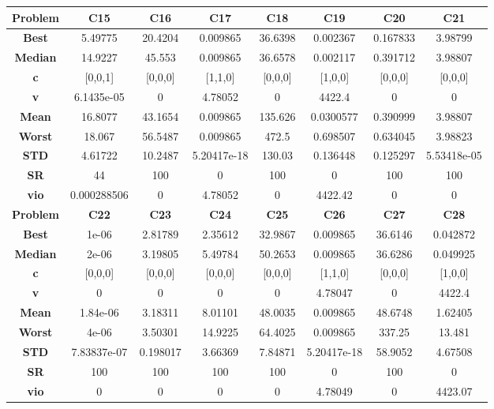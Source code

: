 \documentclass{IEEEtran}
\begin{document}
\begin{center}
\begin{tabular}{|c|c|c|c|c|c|c|c|}
    \hline 
    \hline 
    \textbf{Problem} & \textbf{C15} & \textbf{C16} & \textbf{C17} & \textbf{C18} & \textbf{C19} & \textbf{C20} & \textbf{C21} \\ 
    \hline\hline 
    \textbf{Best} & 5.49775 & 20.4204 & 0.009865 & 36.6398 & 0.002367 & 0.167833 & 3.98799\\ 
    \textbf{Median} & 14.9227 & 45.553 & 0.009865 & 36.6578 & 0.002117 & 0.391712 & 3.98807\\ 
    \textbf{c} & [0,0,1] & [0,0,0] & [1,1,0] & [0,0,0] & [1,0,0] & [0,0,0] & [0,0,0]\\ 
    \textbf{v} & 6.1435e-05 & 0 & 4.78052 & 0 & 4422.4 & 0 & 0\\ 
    \textbf{Mean} & 16.8077 & 43.1654 & 0.009865 & 135.626 & 0.0300577 & 0.390999 & 3.98807\\ 
    \textbf{Worst} & 18.067 & 56.5487 & 0.009865 & 472.5 & 0.698507 & 0.634045 & 3.98823\\ 
    \textbf{STD} & 4.61722 & 10.2487 & 5.20417e-18 & 130.03 & 0.136448 & 0.125297 & 5.53418e-05\\ 
    \textbf{SR} & 44 & 100 & 0 & 100 & 0 & 100 & 100\\ 
    \textbf{vio} & 0.000288506 & 0 & 4.78052 & 0 & 4422.42 & 0 & 0\\ 
    \hline 
    \hline 
    \textbf{Problem} & \textbf{C22} & \textbf{C23} & \textbf{C24} & \textbf{C25} & \textbf{C26} & \textbf{C27} & \textbf{C28} \\ 
    \hline\hline 
    \textbf{Best} & 1e-06 & 2.81789 & 2.35612 & 32.9867 & 0.009865 & 36.6146 & 0.042872\\ 
    \textbf{Median} & 2e-06 & 3.19805 & 5.49784 & 50.2653 & 0.009865 & 36.6286 & 0.049925\\ 
    \textbf{c} & [0,0,0] & [0,0,0] & [0,0,0] & [0,0,0] & [1,1,0] & [0,0,0] & [1,0,0]\\ 
    \textbf{v} & 0 & 0 & 0 & 0 & 4.78047 & 0 & 4422.4\\ 
    \textbf{Mean} & 1.84e-06 & 3.18311 & 8.01101 & 48.0035 & 0.009865 & 48.6748 & 1.62405\\ 
    \textbf{Worst} & 4e-06 & 3.50301 & 14.9225 & 64.4025 & 0.009865 & 337.25 & 13.481\\ 
    \textbf{STD} & 7.83837e-07 & 0.198017 & 3.66369 & 7.84871 & 5.20417e-18 & 58.9052 & 4.67508\\ 
    \textbf{SR} & 100 & 100 & 100 & 100 & 0 & 100 & 0\\ 
    \textbf{vio} & 0 & 0 & 0 & 0 & 4.78049 & 0 & 4423.07\\ 
    \hline 
  \end{tabular}
\end{center}
\end{document}
